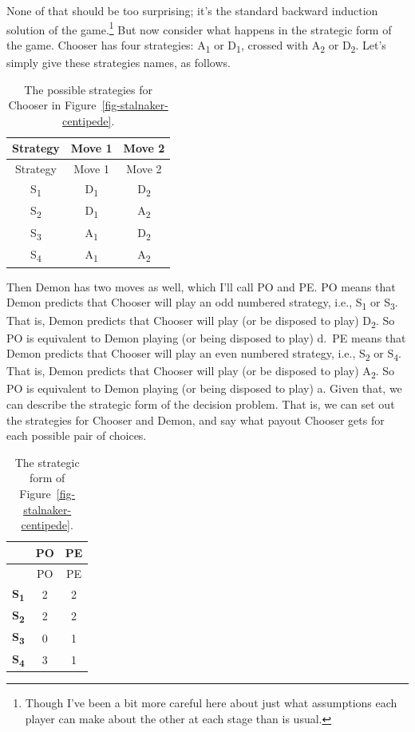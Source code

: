 \documentclass[
  12pt,
  letterpaper,
  DIV=11,
  numbers=noendperiod]{scrreprt}
\begin{document}
None of that should be too surprising; it's the standard backward
induction solution of the game.\footnote{Though I've been a bit more
  careful here about just what assumptions each player can make about
  the other at each stage than is usual.} But now consider what happens
in the strategic form of the game. Chooser has four strategies:
A\textsubscript{1} or D\textsubscript{1}, crossed with
A\textsubscript{2} or D\textsubscript{2}. Let's simply give these
strategies names, as follows.

\hypertarget{tbl-stalnaker-centipede-strategies}{}
\begin{longtable}[]{@{}ccc@{}}
\caption{\label{tbl-stalnaker-centipede-strategies}The possible
strategies for Chooser in
Figure~\ref{fig-stalnaker-centipede}.}\tabularnewline
\toprule\noalign{}
Strategy & Move 1 & Move 2 \\
\midrule\noalign{}
\endfirsthead
\toprule\noalign{}
Strategy & Move 1 & Move 2 \\
\midrule\noalign{}
\endhead
\bottomrule\noalign{}
\endlastfoot
S\textsubscript{1} & D\textsubscript{1} & D\textsubscript{2} \\
S\textsubscript{2} & D\textsubscript{1} & A\textsubscript{2} \\
S\textsubscript{3} & A\textsubscript{1} & D\textsubscript{2} \\
S\textsubscript{4} & A\textsubscript{1} & A\textsubscript{2} \\
\end{longtable}

Then Demon has two moves as well, which I'll call PO and PE. PO means
that Demon predicts that Chooser will play an odd numbered strategy,
i.e., S\textsubscript{1} or S\textsubscript{3}. That is, Demon predicts
that Chooser will play (or be disposed to play) D\textsubscript{2}. So
PO is equivalent to Demon playing (or being disposed to play) d.~PE
means that Demon predicts that Chooser will play an even numbered
strategy, i.e., S\textsubscript{2} or S\textsubscript{4}. That is, Demon
predicts that Chooser will play (or be disposed to play)
A\textsubscript{2}. So PO is equivalent to Demon playing (or being
disposed to play) a. Given that, we can describe the strategic form of
the decision problem. That is, we can set out the strategies for Chooser
and Demon, and say what payout Chooser gets for each possible pair of
choices.

\hypertarget{tbl-stalnaker-centipede}{}
\begin{longtable}[]{@{}ccc@{}}
\caption{\label{tbl-stalnaker-centipede}The strategic form of
Figure~\ref{fig-stalnaker-centipede}.}\tabularnewline
\toprule\noalign{}
& PO & PE \\
\midrule\noalign{}
\endfirsthead
\toprule\noalign{}
& PO & PE \\
\midrule\noalign{}
\endhead
\bottomrule\noalign{}
\endlastfoot
\textbf{S\textsubscript{1}} & 2 & 2 \\
\textbf{S\textsubscript{2}} & 2 & 2 \\
\textbf{S\textsubscript{3}} & 0 & 1 \\
\textbf{S\textsubscript{4}} & 3 & 1 \\
\end{longtable}
\end{document}
